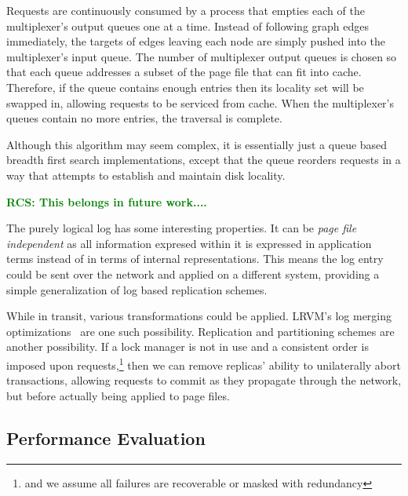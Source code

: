 \documentclass[letterpaper,twocolumn,english]{article}
\newcommand{\yad}{Lemon\xspace}
\newcommand{\rcs}[1]{\textcolor{green}{\bf RCS: #1}}
\begin{document}
Requests are continuously consumed by a process that empties each of
the multiplexer's output queues one at a time.  Instead of following
graph edges immediately, the targets of edges leaving each node are
simply pushed into the multiplexer's input queue.  The number of
multiplexer output queues is chosen so that each queue addresses a
subset of the page file that can fit into cache.  Therefore, if the
queue contains enough entries then its locality set will be swapped
in, allowing requests to be serviced from cache.  When the
multiplexer's queues contain no more entries, the traversal is
complete.  

Although this algorithm may seem complex, it is essentially just a
queue based breadth first search implementations, except that the 
queue reorders requests in a way that attempts to establish and 
maintain disk locality.

\rcs{ This belongs in future work....}

The purely logical log has some interesting properties.  It can be
{\em page file independent} as all information expresed within it is
expressed in application terms instead of in terms of internal
representations.  This means the log entry could be sent over the
network and applied on a different system, providing a simple
generalization of log based replication schemes.

While in transit, various transformations could be applied.  LRVM's
log merging optimizations~\cite{LRVM} are one such possibility.
Replication and partitioning schemes are another possibility.  If a
lock manager is not in use and a consistent order is imposed upon
requests,\footnote{and we assume all failures are recoverable or
masked with redundancy} then we can remove replicas' ability to
unilaterally abort transactions, allowing requests to commit as they
propagate through the network, but before actually being applied to
page files.


\subsection {Performance Evaluation}
\end{document}
